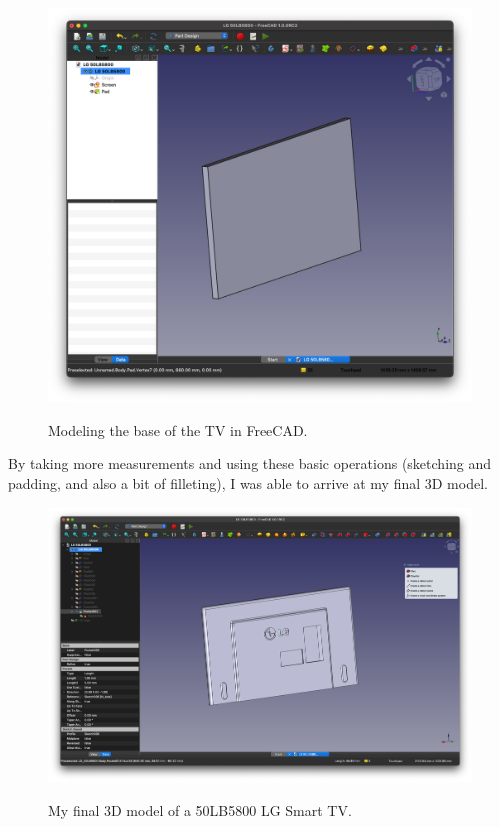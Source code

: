 \documentclass[12pt, letterpaper]{article}
\begin{document}
\begin{figure}[H]
  \medskip
  \centering
  \includegraphics[width=1\linewidth]{a2}
  \caption{Modeling the base of the TV in FreeCAD.}
  \medskip\label{fig:a2}
\end{figure}

By taking more measurements and using these basic operations
(sketching and padding, and also a bit of filleting), I was able to
arrive at my final 3D model.

\begin{figure}[H]
  \medskip
  \centering
  \includegraphics[width=1\linewidth]{a3}
  \caption{My final 3D model of a 50LB5800 LG Smart TV.}
  \medskip\label{fig:a3}
\end{figure}
\end{document}

